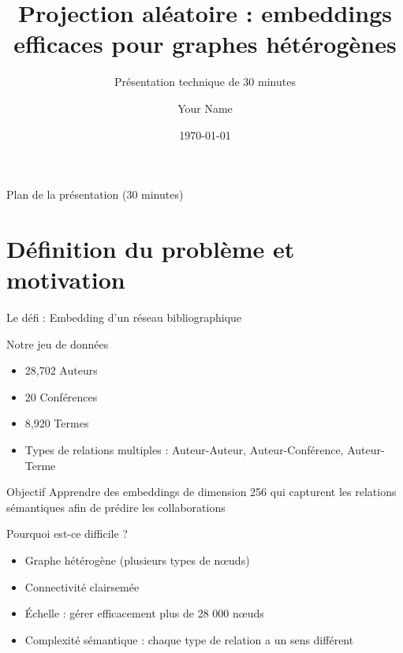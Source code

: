 \documentclass[9pt,aspectratio=169,professionalfonts]{beamer}
\title[Projection aléatoire pour graphes hétérogènes]{Projection aléatoire : embeddings efficaces pour graphes hétérogènes}
\subtitle{Présentation technique de 30 minutes}
\author{Your Name}
\institute{Your Institution}
\date{\today}
\begin{document}
\begin{frame}
\titlepage
\end{frame}

\begin{frame}{Plan de la présentation (30 minutes)}
\tableofcontents
\end{frame}

\section{Définition du problème et motivation}

\begin{frame}{Le défi : Embedding d'un réseau bibliographique}
\begin{block}{Notre jeu de données}
\begin{itemize}
    \item 28,702 Auteurs
    \item 20 Conférences  
    \item 8,920 Termes
    \item Types de relations multiples : Auteur-Auteur, Auteur-Conférence, Auteur-Terme
\end{itemize}
\end{block}

\begin{block}{Objectif}
Apprendre des embeddings de dimension 256 qui capturent les relations sémantiques afin de prédire les collaborations
\end{block}

\begin{alertblock}{Pourquoi est-ce difficile ?}
\begin{itemize}
    \item Graphe hétérogène (plusieurs types de nœuds)
    \item Connectivité clairsemée
    \item Échelle : gérer efficacement plus de 28 000 nœuds
    \item Complexité sémantique : chaque type de relation a un sens différent
\end{itemize}
\end{alertblock}
\end{frame}
\end{document}
